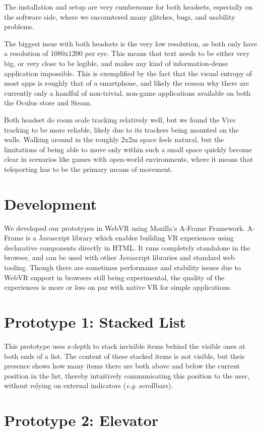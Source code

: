 \documentclass{tufte-book} %
\newcommand{\hairsp}{\hspace{1pt}} %
\newcommand{\eg}{\textit{e.\hairsp{}g.}\xspace} %
\begin{document}
The installation and setup are very cumbersome for both headsets, especially on the software side, where we encountered many glitches, bugs, and usability problems.

The biggest issue with both headsets is the very low resolution, as both only have a resolution of 1080x1200 per eye. This means that text needs to be either very big, or very close to be legible, and makes any kind of information-dense application impossible. This is exemplified by the fact that the visual entropy of most apps is roughly that of a smartphone, and likely the reason why there are currently only a handful of non-trivial, non-game applications available on both the Oculus store and Steam.

Both headset do room scale tracking relatively well, but we found the Vive tracking to be more reliable, likely due to its trackers being mounted on the walls. Walking around in the roughly 2x2m space feels natural, but the limitations of being able to move only within such a small space quickly become clear in scenarios like games with open-world environments, where it means that teleporting has to be the primary means of movement.

\section{Development}
We developed our prototypes in WebVR using Mozilla's A-Frame Framework. A-Frame is a Javascript library which enables building VR experiences using declarative components directly in HTML. It runs completely standalone in the browser, and can be used with other Javascript libraries and standard web tooling. Though there are sometimes performance and stability issues due to WebVR support in browsers still being experimental, the quality of the experiences is more or less on par with native VR for simple applications.

\section{Prototype 1: Stacked List}
This prototype uses z-depth to stack invisible items behind the visible ones at both ends of a list. The content of these stacked items is not visible, but their presence shows how many items there are both above and below the current position in the list, thereby intuitively communicating this position to the user, without relying on external indicators (\eg scrollbars).

\section{Prototype 2: Elevator}
\end{document}
